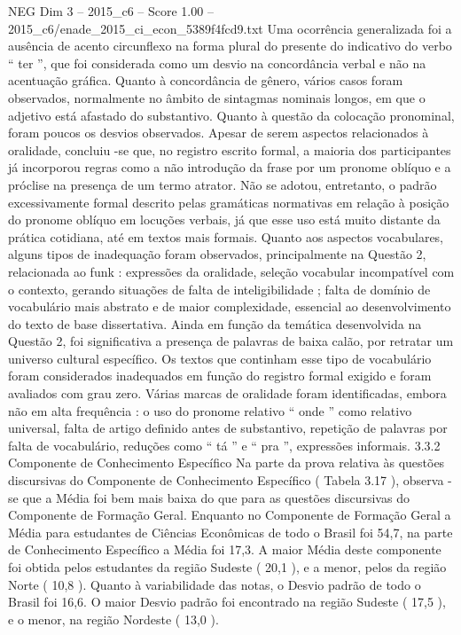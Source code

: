\begin{textsample}{NEG Dim 3 – 2015\_c6 – Score 1.00 – 2015\_c6/enade\_2015\_ci\_econ\_5389f4fcd9.txt}
Uma ocorrência generalizada foi a ausência de acento circunflexo na forma plural do presente do indicativo do verbo “ ter ”, que foi considerada como um desvio na concordância verbal e não na acentuação gráfica.
Quanto à concordância de gênero, vários casos foram observados, normalmente no âmbito de sintagmas nominais longos, em que o adjetivo está afastado do substantivo.
Quanto à questão da colocação pronominal, foram poucos os desvios observados.
Apesar de serem aspectos relacionados à oralidade, concluiu -se que, no registro escrito formal, a maioria dos participantes já incorporou regras como a não introdução da frase por um pronome oblíquo e a próclise na presença de um termo atrator.
Não se adotou, entretanto, o padrão excessivamente formal descrito pelas gramáticas normativas em relação à posição do pronome oblíquo em locuções verbais, já que esse uso está muito distante da prática cotidiana, até em textos mais formais.
Quanto aos aspectos vocabulares, alguns tipos de inadequação foram observados, principalmente na Questão 2, relacionada ao funk : expressões da oralidade, seleção vocabular incompatível com o contexto, gerando situações de falta de inteligibilidade ; falta de domínio de vocabulário mais abstrato e de maior complexidade, essencial ao desenvolvimento do texto de base dissertativa.
Ainda em função da temática desenvolvida na Questão 2, foi significativa a presença de palavras de baixa calão, por retratar um universo cultural específico.
Os textos que continham esse tipo de vocabulário foram considerados inadequados em função do registro formal exigido e foram avaliados com grau zero.
Várias marcas de oralidade foram identificadas, embora não em alta frequência : o uso do pronome relativo “ onde ” como relativo universal, falta de artigo definido antes de substantivo, repetição de palavras por falta de vocabulário, reduções como “ tá ” e “ pra ”, expressões informais. 3.3.2 Componente de Conhecimento Específico Na parte da prova relativa às questões discursivas do Componente de Conhecimento Específico ( Tabela 3.17 ), observa -se que a Média foi bem mais baixa do que para as questões discursivas do Componente de Formação Geral.
Enquanto no Componente de Formação Geral a Média para estudantes de Ciências Econômicas de todo o Brasil foi 54,7, na parte de Conhecimento Específico a Média foi 17,3.
A maior Média deste componente foi obtida pelos estudantes da região Sudeste ( 20,1 ), e a menor, pelos da região Norte ( 10,8 ).
Quanto à variabilidade das notas, o Desvio padrão de todo o Brasil foi 16,6.
O maior Desvio padrão foi encontrado na região Sudeste ( 17,5 ), e o menor, na região Nordeste ( 13,0 ).

\end{textsample}
